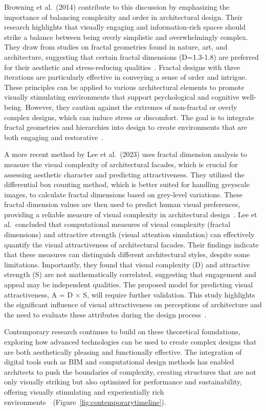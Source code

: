 Browning et al.~(2014) contribute to this discussion by emphasizing the importance of balancing complexity and order in architectural design.
Their research highlights that visually engaging and information-rich spaces should strike a balance between being overly simplistic and overwhelmingly complex.
They draw from studies on fractal geometries found in nature, art, and architecture, suggesting that certain fractal dimensions (D=1.3-1.8) are preferred for their aesthetic and stress-reducing qualities~\cite{Browning2014}.
Fractal designs with three iterations are particularly effective in conveying a sense of order and intrigue.
These principles can be applied to various architectural elements to promote visually stimulating environments that support psychological and cognitive well-being.
However, they caution against the extremes of non-fractal or overly complex designs, which can induce stress or discomfort.
The goal is to integrate fractal geometries and hierarchies into design to create environments that are both engaging and restorative~\cite{Browning2014}.

A more recent method by Lee et al.~(2023) uses fractal dimension analysis to measure the visual complexity of architectural facades, which is crucial for assessing aesthetic character and predicting attractiveness.
They utilized the differential box counting method, which is better suited for handling greyscale images, to calculate fractal dimensions based on grey-level variations.
These fractal dimension values are then used to predict human visual preferences, providing a reliable measure of visual complexity in architectural design~\cite{Lee2023}.
Lee et al.~concluded that computational measures of visual complexity (fractal dimensions) and attractive strength (visual attention simulation) can effectively quantify the visual attractiveness of architectural facades.
Their findings indicate that these measures can distinguish different architectural styles, despite some limitations.
Importantly, they found that visual complexity (D) and attractive strength (S) are not mathematically correlated, suggesting that engagement and appeal may be independent qualities.
The proposed model for predicting visual attractiveness, A = D × S, will require further validation.
This study highlights the significant influence of visual attractiveness on perceptions of architecture and the need to evaluate these attributes during the design process~\cite{Lee2023}.

Contemporary research continues to build on these theoretical foundations, exploring how advanced technologies can be used to create complex designs that are both aesthetically pleasing and functionally effective.
The integration of digital tools such as BIM and computational design methods has enabled architects to push the boundaries of complexity, creating structures that are not only visually striking but also optimized for performance and sustainability, offering visually stimulating and experientially rich environments~\cite{Gage2015}~(Figure~\ref{fig:contemporarytimeline}).

